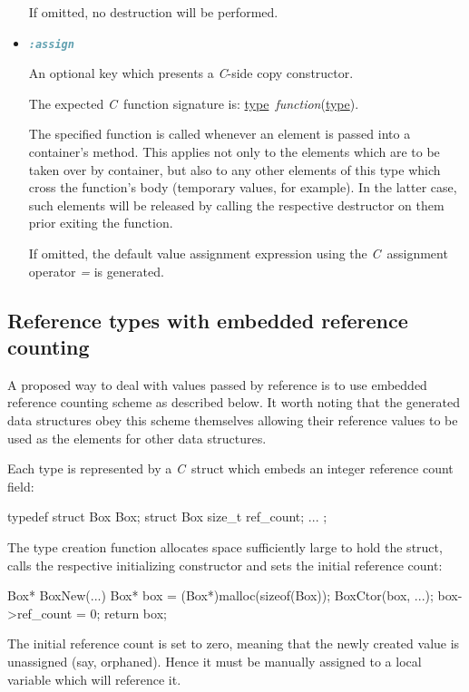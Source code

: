 \documentclass[a4paper]{article}
\newcommand{\C}{\emph{C}}
\newcommand{\st}{\underline{type}}
\newcommand{\meth}[1]{#1}
\begin{document}
\begin{itemize}
If omitted, no destruction will be performed.


\item \lstinline[language=Ruby]!:assign!


An optional key which presents a \C-side copy constructor.


The expected \C\ function signature is: \meth{\st\ \emph{function}(\st)}.


The specified function is called whenever an element is passed into a container's method.
This applies not only to the elements which are to be taken over by container, but also to any other elements of this type which cross the function's body (temporary values, for example).
In the latter case, such elements will be released by calling the respective destructor on them prior exiting the function.


If omitted, the default value assignment expression using the \C\ assignment operator \emph{=} is generated.


\end{itemize}


\subsection{Reference types with embedded reference counting}


A proposed way to deal with values passed by reference is to use embedded reference counting scheme as described below.
It worth noting that the generated data structures obey this scheme themselves allowing their reference values to be used as the elements for other data structures.


Each type is represented by a \C\ struct which embeds an integer reference count field:


\begin{cs}
typedef struct Box Box;
struct Box {
	size_t ref_count;
	...
};
\end{cs}


The type creation function allocates space sufficiently large to hold the struct, calls the respective initializing constructor and sets the initial reference count:


\begin{cs}
Box* BoxNew(...) {
	Box* box = (Box*)malloc(sizeof(Box));
	BoxCtor(box, ...);
	box->ref_count = 0;
	return box;
}
\end{cs}


The initial reference count is set to zero, meaning that the newly created value is unassigned (say, orphaned).
Hence it must be manually assigned to a local variable which will reference it.
\end{document}
